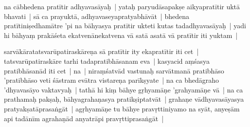\documentclass[article,12pt,a4paper]{memoir}%
\newcounter{parCount}
\begin{document}
	  \pstart \leavevmode%
	na cābhedena pratītir adhyavasāyaḥ | yataḥ paryudāsapakṣe aikyapratītir uktā bhavati | sā ca prayuktā, adhyavaseyapratyabhāvāt | bhedena pratītiniṣedhamātre 'pi na bāhyasya pratītir ukteti kutas tadadhyavasāyaḥ | yadi hi bāhyaṃ prakāśeta ekatvenānekatvena vā satā asatā vā pratītir iti yuktam | 
	{}
	\pend%
      

	  \pstart \leavevmode%
	\label{thakur75-134.31}sarvākāratatsvarūpatiraskāreṇa sā pratītir ity ekapratītir iti cet | tatsvarūpatiraskāre tarhi tadapratibhāsanam eva | kasyacid aṃśasya pratibhāsanād iti cet | na | niraṃśatvād vastunaḥ sarvātmanā pratibhāso 'pratibhāso veti śāstram evātra vistareṇa parīkṣyate | \label{thakur75-135.1} na ca bhedāgraho 'dhyavasāyo vaktavyaḥ | tathā hi kiṃ bāhye gṛhyamāṇe 'grahyamāṇe vā | na ca prathamaḥ pakṣaḥ, bāhyagrahaṇasya pratikṣiptatvāt | grahaṇe vādhyavasāyasya pratyakṣatāprasaṅgāt | agṛhyamāṇe tu bāhye pravṛttiniyamo na syāt, anyeṣām api tadānīm agrahaṇād anyatrāpi pravṛttiprasaṅgāt |
	{}
	\pend%
      
\end{document}
